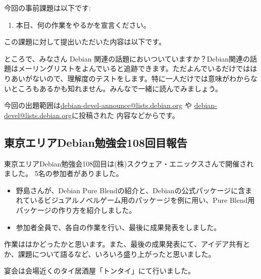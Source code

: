 \documentclass[mingoth,a4paper]{jsarticle}
\begin{document}

今回の事前課題は以下です:
\begin{enumerate}
 \item 本日、何の作業をやるかを宣言ください。
\end{enumerate}
この課題に対して提出いただいた内容は以下です。
\begin{multicols}{2}
{\small

}
\end{multicols}


ところで、みなさん Debian 関連の話題においついていますか？Debian関連の話
題はメーリングリストをよんでいると追跡できます。ただよんでいるだけではは
りあいがないので、理解度のテストをします。特に一人だけでは意味がわからな
いところもあるかも知れません。みんなで一緒に読んでみましょう。

今回の出題範囲は\url{debian-devel-announce@lists.debian.org} や \url{debian-devel@lists.debian.org}に投稿された
内容などからです。

\begin{multicols}{2}

\end{multicols}


\subsection{東京エリアDebian勉強会108回目報告}

 東京エリアDebian勉強会108回目は(株)スクウェア・エニックスさんで開催されました。
5名の参加者がありました。

\begin{itemize}
\item 野島さんが、Debian Pure Blendの紹介と、Debianの公式パッケージに含まれているビジュアルノベルゲーム用のパッケージを例に用い、Pure Blend用パッケージの作り方を紹介しました。
\item 参加者全員で、各自の作業を行い、最後に成果発表をしました。
\end{itemize}

 作業ははかどったかと思います。また、最後の成果発表にて、アイデア共有とか、課題について語るなど、いろいろ盛り上がったと思いました。

 宴会は会場近くのタイ居酒屋「トンタイ」にて行いました。

\end{document}

